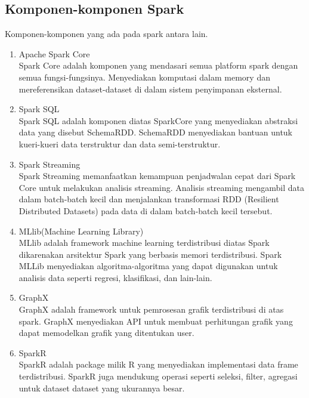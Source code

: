 \subsection{Komponen-komponen Spark}
Komponen-komponen yang ada pada spark antara lain.
\begin{enumerate}
\item Apache Spark Core\\
Spark Core adalah komponen yang mendasari semua platform spark dengan semua fungsi-fungsinya. Menyediakan komputasi dalam memory dan mereferensikan dataset-dataset di dalam sistem penyimpanan eksternal.
\item Spark SQL \\
Spark SQL adalah komponen diatas SparkCore yang menyediakan abstraksi data yang disebut SchemaRDD. SchemaRDD menyediakan bantuan untuk kueri-kueri data terstruktur dan data semi-terstruktur.
\item Spark Streaming\\
Spark Streaming memanfaatkan kemampuan penjadwalan cepat dari Spark Core untuk melakukan analisis streaming. Analisis streaming mengambil data dalam batch-batch kecil dan menjalankan transformasi RDD (Resilient Distributed Datasets) pada data di dalam batch-batch kecil tersebut.
\item MLlib(Machine Learning Library)\\
MLlib adalah framework machine learning terdistribusi diatas Spark dikarenakan arsitektur Spark yang berbasis memori terdistribusi. Spark MLLib menyediakan algoritma-algoritma yang dapat digunakan untuk analisis data seperti regresi, klasifikasi, dan lain-lain.
\item GraphX\\
GraphX adalah framework untuk pemrosesan grafik terdistribusi di atas spark. GraphX menyediakan API untuk membuat perhitungan grafik yang dapat memodelkan grafik yang ditentukan user.
\item SparkR\\
SparkR adalah package milik R yang menyediakan implementasi data frame terdistribusi. SparkR juga mendukung operasi seperti seleksi, filter, agregasi untuk dataset dataset yang ukurannya besar.

\end{enumerate}


